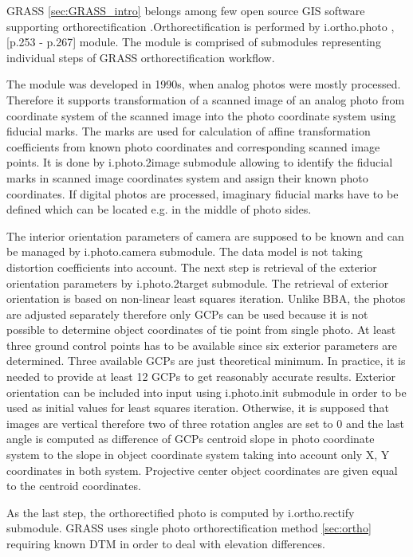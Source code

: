 \documentclass[a4paper,12pt]{article}
\begin{document}
GRASS \ref{sec:GRASS_intro} belongs among few open source GIS software supporting orthorectification
\cite{rocchini2012robust}.Orthorectification is performed 
by i.ortho.photo \cite{i.ortho.photo}, \cite{neteler2008open}[p.253 - p.267] module.
The module is comprised of submodules representing individual steps of 
GRASS orthorectification workflow.

The module was developed in 1990s,  
when analog photos were mostly processed. Therefore it supports 
 transformation of a scanned image of an analog photo from coordinate system of the scanned image into 
 the photo coordinate system using fiducial marks. The marks are used for calculation of 
 affine transformation coefficients from known photo coordinates 
 and corresponding scanned image points.
 It is done by i.photo.2image submodule allowing to identify the fiducial 
 marks in scanned image coordinates system and assign their known photo coordinates.
  If digital photos are processed, imaginary fiducial marks have to be defined which
can be located e.g. in the middle of photo sides.  
  
The interior orientation parameters of camera are supposed to be known and can 
be managed by i.photo.camera submodule.
The data model is not taking distortion 
coefficients into account. 
The next step is retrieval of the exterior orientation parameters by i.photo.2target submodule.  
The retrieval 
of exterior orientation is based on non-linear least squares iteration. Unlike BBA,
the photos are adjusted separately therefore only GCPs can be used
because it is not possible to determine object coordinates of tie point from single photo.
At least three ground control points has to be available since six exterior parameters are 
determined. Three available GCPs are just theoretical minimum. In practice, it is needed to provide at least 12 GCPs
to get reasonably accurate results. Exterior orientation 
can be included into input using i.photo.init submodule in order to be used as initial values for least squares iteration.
Otherwise, it is supposed that images are vertical therefore two of three rotation
angles are set to 0 and the last angle is computed as difference of GCPs centroid  slope
in photo coordinate system to the slope in object coordinate system taking into account only X, Y coordinates in both system.
Projective center object coordinates are given equal to the centroid coordinates.

As the last step, the orthorectified photo is computed by i.ortho.rectify submodule. GRASS uses single photo orthorectification
method \ref{sec:ortho} requiring known DTM in order to deal with elevation differences. 
\end{document}
